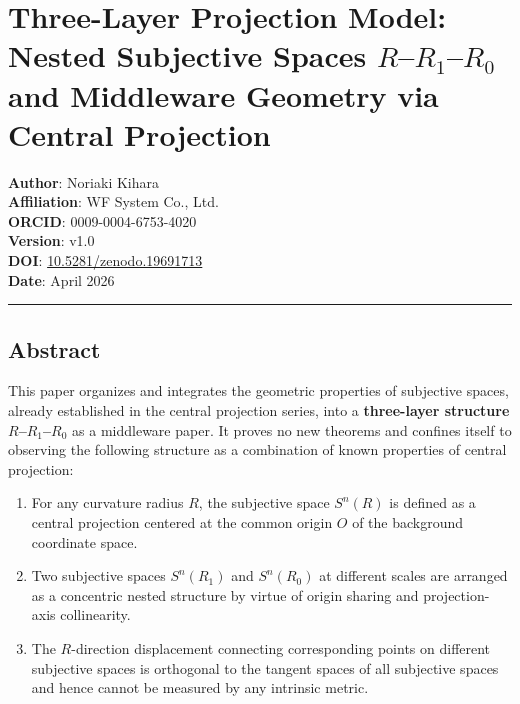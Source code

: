 \documentclass[
  a4paper,11pt]{article}
\author{}
\date{}
\providecommand{\tightlist}{%
  \setlength{\itemsep}{0pt}\setlength{\parskip}{0pt}}
\begin{document}
\section{\texorpdfstring{Three-Layer Projection Model: Nested Subjective
Spaces \(R\)--\(R_1\)--\(R_0\) and Middleware Geometry via Central
Projection}{Three-Layer Projection Model: Nested Subjective Spaces R--R\_1--R\_0 and Middleware Geometry via Central Projection}}\label{three-layer-projection-model-nested-subjective-spaces-rr_1r_0-and-middleware-geometry-via-central-projection}

\textbf{Author}: Noriaki Kihara\\
\textbf{Affiliation}: WF System Co., Ltd.\\
\textbf{ORCID}: 0009-0004-6753-4020\\
\textbf{Version}: v1.0\\
\textbf{DOI}:
\href{https://doi.org/10.5281/zenodo.19691713}{10.5281/zenodo.19691713}\\
\textbf{Date}: April 2026

\begin{center}\rule{0.5\linewidth}{0.5pt}\end{center}

\subsection{Abstract}\label{abstract}

This paper organizes and integrates the geometric properties of
subjective spaces, already established in the central projection series,
into a \textbf{three-layer structure \(R\)--\(R_1\)--\(R_0\)} as a
middleware paper. It proves no new theorems and confines itself to
observing the following structure as a combination of known properties
of central projection:

\begin{enumerate}
\def\labelenumi{\arabic{enumi}.}
\tightlist
\item
  For any curvature radius \(R\), the subjective space \(S^n(R)\) is
  defined as a central projection centered at the common origin \(O\) of
  the background coordinate space.
\item
  Two subjective spaces \(S^n(R_1)\) and \(S^n(R_0)\) at different
  scales are arranged as a concentric nested structure by virtue of
  origin sharing and projection-axis collinearity.
\item
  The \(R\)-direction displacement connecting corresponding points on
  different subjective spaces is orthogonal to the tangent spaces of all
  subjective spaces and hence cannot be measured by any intrinsic
  metric.
\end{enumerate}
\end{document}
